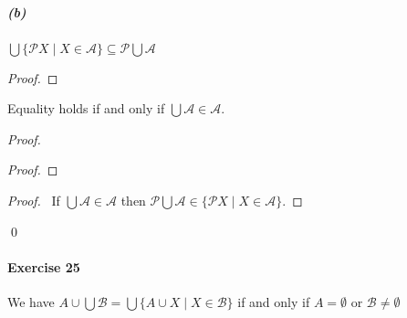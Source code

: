 \documentclass{report}
\begin{document}
    \subparagraph{(b)}
    $\bigcup \{ \mathcal{P} X \mid X \in \mathcal{A} \} \subseteq \mathcal{P} \bigcup \mathcal{A}$

    \begin{proof}
        \pf
    \end{proof}

    Equality holds if and only if $\bigcup \mathcal{A} \in \mathcal{A}$.
    \begin{proof}
        \begin{proof}
        \end{proof}
        \begin{proof}
            \pf\ If $\bigcup \mathcal{A} \in \mathcal{A}$ then $\mathcal{P} \bigcup \mathcal{A}
            \in \{ \mathcal{P} X \mid X \in \mathcal{A} \}$.
        \end{proof}
        \qed
    \end{proof}

    \paragraph{Exercise 25}
    We have $A \cup \bigcup \mathcal{B} = \bigcup \{ A \cup X \mid X \in \mathcal{B} \}$ if and only if
    $A = \emptyset$ or $\mathcal{B} \neq \emptyset$
\end{document}

